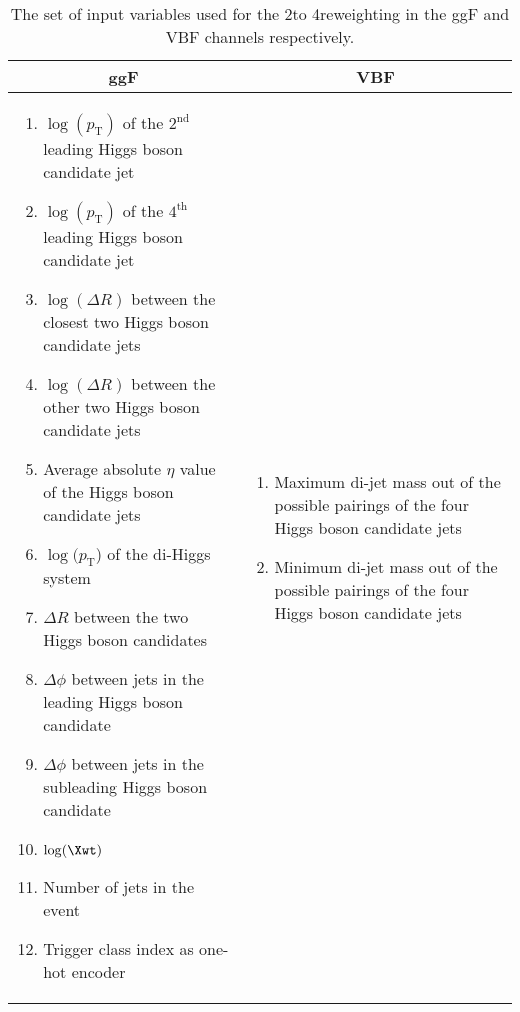 \begin{table}[hbt]
        \centering
        \caption{\label{tbl:rw-vars} The set of input variables used for the 2\Pqb to 4\Pqb reweighting in the
        ggF and VBF channels respectively.
}
        \begin{tabular}{p{7cm}|p{7cm}}
        \toprule
        \multicolumn{1}{c|}{\textbf{ggF}} & \multicolumn{1}{c}{\textbf{VBF}} \\
        \hline
        \begin{enumerate}
        \itemsep0em
                \item $\log(p_\mathrm{T} )$ of the $2^\mathrm{nd}$ leading Higgs boson candidate jet
                \item $\log(p_\mathrm{T} )$ of the $4^\mathrm{th}$ leading Higgs boson candidate jet
                \item $\log(\Delta R)$ between the closest two Higgs boson candidate jets
                \item $\log(\Delta R)$ between the other two Higgs boson candidate jets
                \item Average absolute $\eta$ value of the Higgs boson candidate jets
                \item $\log(p_\mathrm{T}$) of the di-Higgs system
                \item $\Delta R$ between the two Higgs boson candidates
                \item $\Delta \phi$ between jets in the leading Higgs boson candidate
                \item $\Delta \phi$ between jets in the subleading Higgs boson candidate
                \item $\log(\Xwt)$%
                \item Number of jets in the event
                \item Trigger class index as one-hot encoder
        \end{enumerate}
        &
        \begin{enumerate}
        \itemsep0em
                \item Maximum di-jet mass out of the possible pairings of the four Higgs boson candidate jets
                \item Minimum di-jet mass out of the possible pairings of the four Higgs boson candidate jets

\end{enumerate}
\end{tabular}
\end{table}
